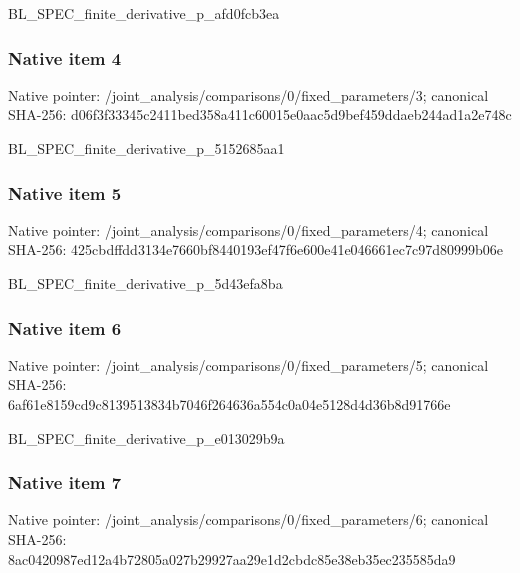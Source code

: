 \documentclass[10pt,a4paper]{article}
\begin{document}
\begingroup\raggedright\sloppy BL\_\allowbreak{}SPEC\_\allowbreak{}finite\_\allowbreak{}derivative\_\allowbreak{}p\_\allowbreak{}afd0fcb3ea\par\endgroup

\subsubsection{Native item 4}
Native pointer: /joint\_\allowbreak{}analysis/comparisons/0/fixed\_\allowbreak{}parameters/3; canonical SHA-256: d06f3f33345c2411bed358a411c60015e0aac5d9bef459ddaeb244ad1a2e748c

\begingroup\raggedright\sloppy BL\_\allowbreak{}SPEC\_\allowbreak{}finite\_\allowbreak{}derivative\_\allowbreak{}p\_\allowbreak{}5152685aa1\par\endgroup

\subsubsection{Native item 5}
Native pointer: /joint\_\allowbreak{}analysis/comparisons/0/fixed\_\allowbreak{}parameters/4; canonical SHA-256: 425cbdffdd3134e7660bf8440193ef47f6e600e41e046661ec7c97d80999b06e

\begingroup\raggedright\sloppy BL\_\allowbreak{}SPEC\_\allowbreak{}finite\_\allowbreak{}derivative\_\allowbreak{}p\_\allowbreak{}5d43efa8ba\par\endgroup

\subsubsection{Native item 6}
Native pointer: /joint\_\allowbreak{}analysis/comparisons/0/fixed\_\allowbreak{}parameters/5; canonical SHA-256: 6af61e8159cd9c8139513834b7046f264636a554c0a04e5128d4d36b8d91766e

\begingroup\raggedright\sloppy BL\_\allowbreak{}SPEC\_\allowbreak{}finite\_\allowbreak{}derivative\_\allowbreak{}p\_\allowbreak{}e013029b9a\par\endgroup

\subsubsection{Native item 7}
Native pointer: /joint\_\allowbreak{}analysis/comparisons/0/fixed\_\allowbreak{}parameters/6; canonical SHA-256: 8ac0420987ed12a4b72805a027b29927aa29e1d2cbdc85e38eb35ec235585da9
\end{document}
